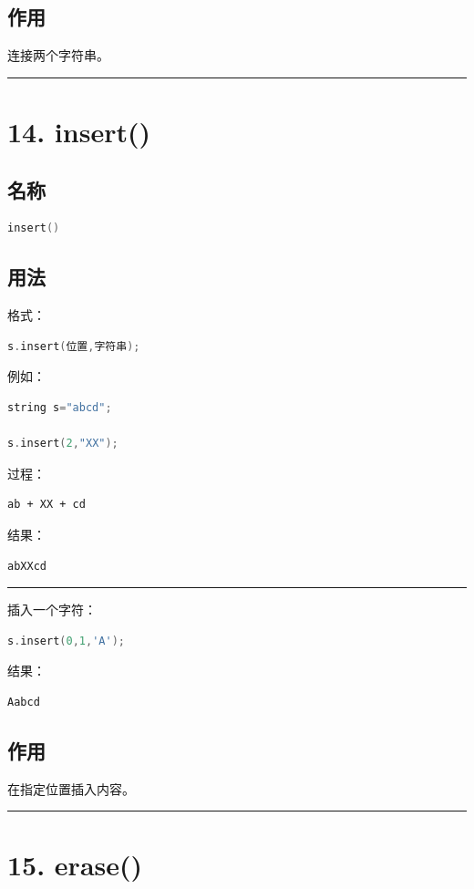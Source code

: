 \documentclass[10pt,twocolumn]{extarticle}
\begin{document}
\subsection{作用}
连接两个字符串。

\noindent\rule{\linewidth}{0.4pt}

\section{14. insert()}

\subsection{名称}
\begin{lstlisting}[language=C++]
insert()
\end{lstlisting}

\subsection{用法}
格式：
\begin{lstlisting}[language=C++]
s.insert(位置,字符串);
\end{lstlisting}
例如：
\begin{lstlisting}[language=C++]
string s="abcd";

s.insert(2,"XX");
\end{lstlisting}
过程：
\begin{lstlisting}
ab + XX + cd
\end{lstlisting}
结果：
\begin{lstlisting}
abXXcd
\end{lstlisting}

\noindent\rule{\linewidth}{0.4pt}

插入一个字符：
\begin{lstlisting}[language=C++]
s.insert(0,1,'A');
\end{lstlisting}
结果：
\begin{lstlisting}
Aabcd
\end{lstlisting}

\subsection{作用}
在指定位置插入内容。

\noindent\rule{\linewidth}{0.4pt}

\section{15. erase()}
\end{document}
